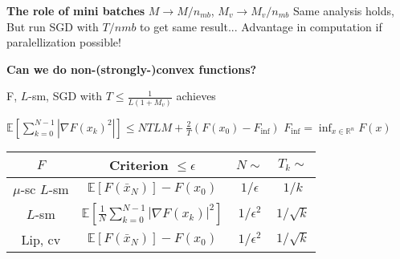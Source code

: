 \textbf{The role of mini batches}
$M\rightarrow{M/n_{mb}}$, $M_v \rightarrow{M_v/n_{mb}}$
Same analysis holds,
But run SGD with $T/n{mb}$ to get same result...
Advantage in computation if paralellization possible!

\textbf{Can we do non-(strongly-)convex functions? }

\begin{proposition}
	F, $L$-sm, SGD with
	$T\le \frac{1}{L(1+M_v)}$ achieves

	$\mathbb{E}[\sum_{k=0}^{N-1}|\nabla F(x_k)^2|]
		\le NTLM + \frac{2}{T}(F(x_0)-F_\text{inf})$
	$F_\text{inf} = \operatorname{inf}_{x\in\mathbb{R}^n}F(x)$
\end{proposition}

\begin{tabular}{|c|c|c|c|}
	\hline
	$F$             & Criterion                              $\leq \epsilon$       & $N \sim$       & $T_k \sim$   \\ \hline
	$\mu$-sc $L$-sm & $\mathbb{E}[F(\bar{x}_N)] - F(x_0)$                          & $1/\epsilon$   & $1/k$        \\ \hline
	$L$-sm          & $\mathbb{E}[\frac{1}{N} \sum_{k=0}^{N-1} |\nabla F(x_k)|^2]$ & $1/\epsilon^2$ & $1/\sqrt{k}$ \\ \hline
	Lip, cv         & $\mathbb{E}[F(\bar{x}_N)] - F(x_0) $                         & $1/\epsilon^2$ & $1/\sqrt{k}$ \\ \hline
\end{tabular}

